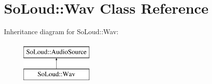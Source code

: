 \hypertarget{class_so_loud_1_1_wav}{}\section{So\+Loud\+::Wav Class Reference}
\label{class_so_loud_1_1_wav}
Inheritance diagram for So\+Loud\+::Wav\+:\begin{figure}[H]
\begin{center}
\leavevmode
\includegraphics[height=2.000000cm]{class_so_loud_1_1_wav}
\end{center}
\end{figure}
